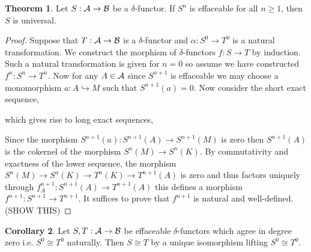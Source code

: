 \documentclass[12pt]{extarticle}
\theoremstyle{definition}
\newtheorem{theorem}{Theorem}[section]
\newtheorem{corollary}[theorem]{Corollary}
\begin{document}
\begin{theorem}
Let $S : \mathcal{A} \to \mathcal{B}$ be a $\delta$-functor. If $S^n$ is effaceable for all $n \ge 1$, then $S$ is universal. 
\end{theorem}

\begin{proof}
Suppose that $T : \mathcal{A} \to \mathcal{B}$ is a $\delta$-functor and $\alpha : S^0 \to T^0$ is a natural transformation. We construct the morphism of $\delta$-functors $f : S \to T$ by induction. Such a natural transformation is given for $n = 0$ so assume we have constructed $f^n : S^n \to T^n$. Now for any $A \in \mathcal{A}$ since $S^{n+1}$ is effaceable we may choose a monomorphism $a : A \hookrightarrow M$ such that $S^{n+1}(a) = 0$. Now consider the short exact sequence,
\begin{center}
\end{center}
which gives rise to long exact sequences,
\begin{center}
\end{center}
Since the morphism $S^{n+1}(a) : S^{n+1}(A) \to S^{n+1}(M)$ is zero then $S^{n+1}(A)$ is the cokernel of the morphism $S^n(M) \to S^{n}(K)$. By commutativity and exactness of the lower sequence, the morphism $S^n(M) \to S^n(K) \to T^n(K) \to T^{n+1}(A)$ is zero and thus factors uniquely through $f^{n+1}_A : S^{n+1}(A) \to T^{n+1}(A)$ this defines a morphism $f^{n+1} : S^{n+1} \to T^{n+1}$. It suffices to prove that $f^{n+1}$ is natural and well-defined. (SHOW THIS)
\end{proof}

\begin{corollary}
Let $S, T : \mathcal{A} \to \mathcal{B}$ be effaceable $\delta$-functors which agree in degree zero i.e. $S^0 \cong T^0$ naturally. Then $S \cong T$ by a unique isomorphism lifting $S^0 \cong T^0$.  
\end{corollary}
\end{document}
